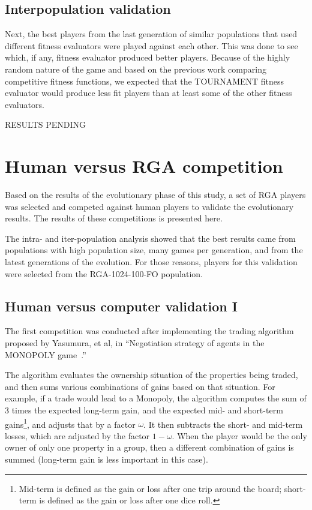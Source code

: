 \subsection{Interpopulation validation} \label{6_interpopValidation}

Next, the best players from the last generation of similar populations that used
different fitness evaluators were played against each other. This was done to
see which, if any, fitness evaluator produced better players. Because of the
highly random nature of the game and based on the previous work comparing
competitive fitness functions, we expected that the TOURNAMENT fitness evaluator
would produce less fit players than at least some of the other fitness
evaluators.

RESULTS PENDING

\section{Human versus RGA competition}

Based on the results of the evolutionary phase of this study, a set of RGA
players was selected and competed against human players to validate the
evolutionary results. The results of these competitions is presented here.

The intra- and iter-population analysis showed that the best results came from
populations with high population size, many games per generation, and from the
latest generations of the evolution. For those reasons, players for this
validation were selected from the RGA-1024-100-FO population.

\subsection{Human versus computer validation I}\label{6_humanVRGA1}

The first competition was conducted after implementing the trading algorithm
proposed by Yasumura, et al, in ``Negotiation strategy of agents in the MONOPOLY
game~\cite{Yasumura2001Negotiate}.''

The algorithm evaluates the ownership situation of the properties being traded,
and then sums various combinations of gains based on that situation. For
example, if a trade would lead to a Monopoly, the algorithm computes the sum of
3 times the expected long-term gain, and the expected mid- and short-term
gains\footnote{Mid-term is defined as the gain or loss after one trip around the
board; short-term is defined as the gain or loss after one dice roll.}, and
adjusts that by a factor \(\omega\). It then subtracts the short- and mid-term
losses, which are adjusted by the factor \(1-\omega\). When the player would be
the only owner of only one property in a group, then a different combination of
gains is summed (long-term gain is less important in this case).

